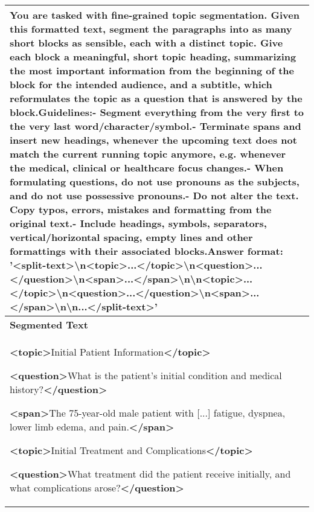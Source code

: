 \begin{table*}[ht]
{\begin{tabular}{p{\textwidth}}
You are tasked with fine-grained topic segmentation. Given this formatted text, segment the paragraphs into as many short blocks as sensible, each with a distinct topic. Give each block a meaningful, short topic heading, summarizing the most important information from the beginning of the block for the intended audience, and a subtitle, which reformulates the topic as a question that is answered by the block.\newline Guidelines:\newline  - Segment everything from the very first to the very last word/character/symbol.\newline - Terminate spans and insert new headings, whenever the upcoming text does not match the current running topic anymore, e.g. whenever the medical, clinical or healthcare focus changes.\newline - When formulating questions, do not use pronouns as the subjects, and do not use possessive pronouns.\newline - Do not alter the text. Copy typos, errors, mistakes and formatting from the original text.\newline  - Include headings, symbols, separators, vertical/horizontal spacing, empty lines and other formattings with their associated blocks.\newline Answer format: '<split-text>\textbackslash n\allowbreak<topic>...\allowbreak</topic>\textbackslash n\allowbreak<question>...\allowbreak</question>\textbackslash n\allowbreak<span>...\allowbreak</span>\textbackslash n\textbackslash n\allowbreak<topic>...\allowbreak</topic>\textbackslash n\allowbreak<question>...\allowbreak</question>\textbackslash n\allowbreak<span>...\allowbreak</span>\textbackslash n\textbackslash n\allowbreak...\allowbreak</split-text>' \\
\hline
 \textbf{Segmented Text} \\
\hline
\textbf{<topic>}Initial Patient Information\textbf{</topic>}

\textbf{<question>}What is the patient's initial condition and medical history?\textbf{</question>}

\textbf{<span>}\textcolor{MutedCoral}{The 75-year-old male patient with [...] fatigue, dyspnea, lower limb edema, and pain.}\textbf{</span>}

\textbf{<topic>}Initial Treatment and Complications\textbf{</topic>}

\textbf{<question>}What treatment did the patient receive initially, and what complications arose?\textbf{</question>}


\end{tabular}}
\end{table*}
